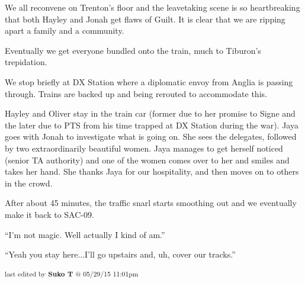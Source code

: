 We all reconvene on Trenton's floor and the leavetaking scene is so heartbreaking that both Hayley and Jonah get flaws of Guilt. It is clear that we are ripping apart a family and a community.



Eventually we get everyone bundled onto the train, much to Tiburon's trepidation.



We stop briefly at DX Station where a diplomatic envoy from Anglia is passing through.  Trains are backed up and being rerouted to accommodate this.



Hayley and Oliver stay in the train car (former due to her promise to Signe and the later due to PTS from his time trapped at DX Station during the war).  Jaya goes with Jonah to investigate what is going on.  She sees the delegates, followed by two extraordinarily beautiful women.  Jaya manages to get herself noticed (senior TA authority) and one of the women comes over to her and smiles and takes her hand.  She thanks Jaya for our hospitality, and then moves on to others in the crowd.



After about 45 minutes, the traffic snarl starts smoothing out and we eventually make it back to SAC-09.






``I'm not magic.  Well actually I kind of am.''




``Yeah you stay here...I'll go upstairs and, uh, cover our tracks.''



\vspace{\fill}

\begin{flushright}
\textsubscript{last edited by \textbf{Suko T} @ 05/29/15 11:01pm}
\end{flushright}
